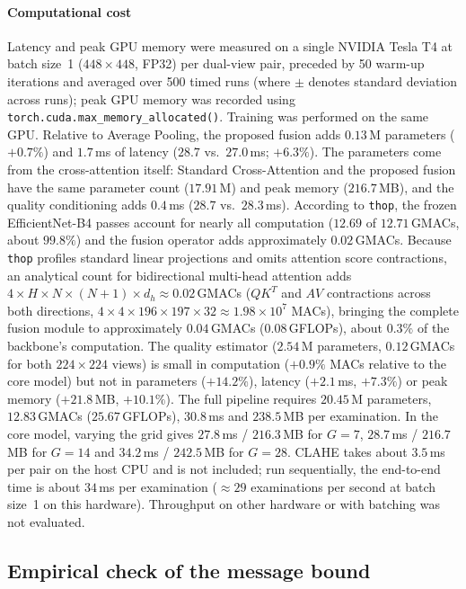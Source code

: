 \documentclass[final,5p,times,twocolumn,authoryear]{elsarticle}
\theoremstyle{plain}
\theoremstyle{remark}
\begin{document}
\paragraph{Computational cost} Latency and peak GPU memory were measured on a single NVIDIA Tesla T4 at batch size~1 ($448\times448$, FP32) per dual-view pair, preceded by 50 warm-up iterations and averaged over 500 timed runs (where $\pm$ denotes standard deviation across runs); peak GPU memory was recorded using \texttt{torch.cuda.max\_memory\_allocated()}. Training was performed on the same GPU. Relative to Average Pooling, the proposed fusion adds $0.13$\,M parameters ($+0.7\%$) and $1.7$\,ms of latency ($28.7$ vs.\ $27.0$\,ms; $+6.3\%$). The parameters come from the cross-attention itself: Standard Cross-Attention and the proposed fusion have the same parameter count ($17.91$\,M) and peak memory ($216.7$\,MB), and the quality conditioning adds $0.4$\,ms ($28.7$ vs.\ $28.3$\,ms). According to \texttt{thop}, the frozen EfficientNet-B4 passes account for nearly all computation ($12.69$ of $12.71$\,GMACs, about $99.8\%$) and the fusion operator adds approximately $0.02$\,GMACs. Because \texttt{thop} profiles standard linear projections and omits attention score contractions, an analytical count for bidirectional multi-head attention adds $4 \times H \times N \times (N+1) \times d_h \approx 0.02$\,GMACs ($QK^T$ and $AV$ contractions across both directions, $4 \times 4 \times 196 \times 197 \times 32 \approx 1.98 \times 10^7$ MACs), bringing the complete fusion module to approximately $0.04$\,GMACs ($0.08$\,GFLOPs), about $0.3\%$ of the backbone's computation.
The quality estimator ($2.54$\,M parameters, $0.12$\,GMACs for both $224\times224$ views) is small in computation ($+0.9\%$ MACs relative to the core model) but not in parameters ($+14.2\%$), latency ($+2.1$\,ms, $+7.3\%$) or peak memory ($+21.8$\,MB, $+10.1\%$). The full pipeline requires $20.45$\,M parameters, $12.83$\,GMACs ($25.67$\,GFLOPs), $30.8$\,ms and $238.5$\,MB per examination. In the core model, varying the grid gives $27.8$\,ms / $216.3$\,MB for $G=7$, $28.7$\,ms / $216.7$\,MB for $G=14$ and $34.2$\,ms / $242.5$\,MB for $G=28$. CLAHE takes about $3.5$\,ms per pair on the host CPU and is not included; run sequentially, the end-to-end time is about $34$\,ms per examination ($\approx29$ examinations per second at batch size~1 on this hardware). Throughput on other hardware or with batching was not evaluated.

\subsection{Empirical check of the message bound}
\label{sec:r_prop1}
\end{document}

